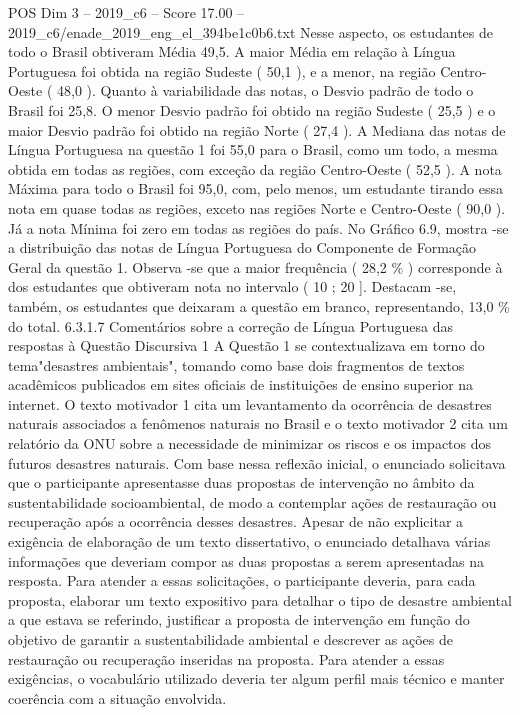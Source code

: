 \begin{textsample}{POS Dim 3 – 2019\_c6 – Score 17.00 – 2019\_c6/enade\_2019\_eng\_el\_394be1c0b6.txt}
Nesse aspecto, os estudantes de todo o Brasil obtiveram Média 49,5.
A maior Média em relação à Língua Portuguesa foi obtida na região Sudeste ( 50,1 ), e a menor, na região Centro-Oeste ( 48,0 ).
Quanto à variabilidade das notas, o Desvio padrão de todo o Brasil foi 25,8.
O menor Desvio padrão foi obtido na região Sudeste ( 25,5 ) e o maior Desvio padrão foi obtido na região Norte ( 27,4 ).
A Mediana das notas de Língua Portuguesa na questão 1 foi 55,0 para o Brasil, como um todo, a mesma obtida em todas as regiões, com exceção da região Centro-Oeste ( 52,5 ).
A nota Máxima para todo o Brasil foi 95,0, com, pelo menos, um estudante tirando essa nota em quase todas as regiões, exceto nas regiões Norte e Centro-Oeste ( 90,0 ).
Já a nota Mínima foi zero em todas as regiões do país.
No Gráfico 6.9, mostra -se a distribuição das notas de Língua Portuguesa do Componente de Formação Geral da questão 1.
Observa -se que a maior frequência ( 28,2 \% ) corresponde à dos estudantes que obtiveram nota no intervalo ( 10 ; 20 ].
Destacam -se, também, os estudantes que deixaram a questão em branco, representando, 13,0 \% do total. 6.3.1.7 Comentários sobre a correção de Língua Portuguesa das respostas à Questão Discursiva 1 A Questão 1 se contextualizava em torno do tema"desastres ambientais", tomando como base dois fragmentos de textos acadêmicos publicados em sites oficiais de instituições de ensino superior na internet.
O texto motivador 1 cita um levantamento da ocorrência de desastres naturais associados a fenômenos naturais no Brasil e o texto motivador 2 cita um relatório da ONU sobre a necessidade de minimizar os riscos e os impactos dos futuros desastres naturais.
Com base nessa reflexão inicial, o enunciado solicitava que o participante apresentasse duas propostas de intervenção no âmbito da sustentabilidade socioambiental, de modo a contemplar ações de restauração ou recuperação após a ocorrência desses desastres.
Apesar de não explicitar a exigência de elaboração de um texto dissertativo, o enunciado detalhava várias informações que deveriam compor as duas propostas a serem apresentadas na resposta.
Para atender a essas solicitações, o participante deveria, para cada proposta, elaborar um texto expositivo para detalhar o tipo de desastre ambiental a que estava se referindo, justificar a proposta de intervenção em função do objetivo de garantir a sustentabilidade ambiental e descrever as ações de restauração ou recuperação inseridas na proposta.
Para atender a essas exigências, o vocabulário utilizado deveria ter algum perfil mais técnico e manter coerência com a situação envolvida.

\end{textsample}
